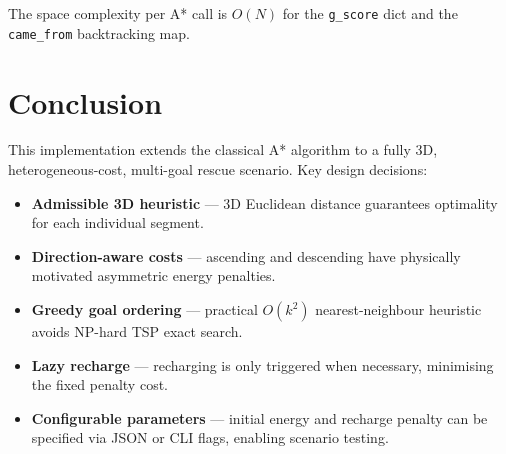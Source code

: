 \documentclass[12pt]{article}
\begin{document}
The space complexity per A* call is $O(N)$ for the \texttt{g\_score} dict and
the \texttt{came\_from} backtracking map.

\section{Conclusion}

This implementation extends the classical A* algorithm to a fully 3D,
heterogeneous-cost, multi-goal rescue scenario.
Key design decisions:

\begin{itemize}
    \item \textbf{Admissible 3D heuristic} — 3D Euclidean distance guarantees
          optimality for each individual segment.
    \item \textbf{Direction-aware costs} — ascending and descending have
          physically motivated asymmetric energy penalties.
    \item \textbf{Greedy goal ordering} — practical $O(k^2)$ nearest-neighbour
          heuristic avoids NP-hard TSP exact search.
    \item \textbf{Lazy recharge} — recharging is only triggered when necessary,
          minimising the fixed penalty cost.
    \item \textbf{Configurable parameters} — initial energy and recharge penalty
          can be specified via JSON or CLI flags, enabling scenario testing.
\end{itemize}
\end{document}
